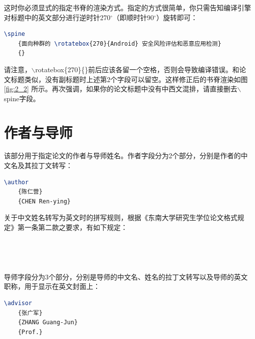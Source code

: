 \noindent 这时你必须显式的指定书脊的渲染方式。指定的方式很简单，你只需告知编译引擎对标题中的英文部分进行逆时针270$^{\circ}$（即顺时针90$^{\circ}$）旋转即可：

\begin{tcolorbox}
\begin{lstlisting}[language=TeX]
\spine
    {面向种群的 \rotatebox{270}{Android} 安全风险评估和恶意应用检测}
    {}
\end{lstlisting}
\end{tcolorbox}

\noindent 请注意，{\codefont $\backslash$rotatebox\{270\}\{\}}前后应该各留一个空格，否则会导致编译错误。和论文标题类似，没有副标题时上述第2个字段可以留空。这样修正后的书脊渲染如图 \ref{fig:2_2} 所示。再次强调，如果你的论文标题中没有中西文混排，请直接删去{\codefont $\backslash$spine}字段。

\section{作者与导师}

该部分用于指定论文的作者与导师姓名。作者字段分为2个部分，分别是作者的中文名及其拉丁文转写：

\begin{tcolorbox}
\begin{lstlisting}[language=TeX]
\author
    {陈仁营}
    {CHEN Ren-ying}
\end{lstlisting}
\end{tcolorbox}

\noindent 关于中文姓名转写为英文时的拼写规则，根据《东南大学研究生学位论文格式规定》\cite{seugs2015rule}第一条第二款之要求，有如下规定：

~


~

导师字段分为3个部分，分别是导师的中文名、姓名的拉丁文转写以及导师的英文职称，用于显示在英文封面上：

\begin{tcolorbox}
\begin{lstlisting}[language=TeX]
\advisor
    {张广军}
    {ZHANG Guang-Jun}
    {Prof.}
\end{lstlisting}
\end{tcolorbox}

